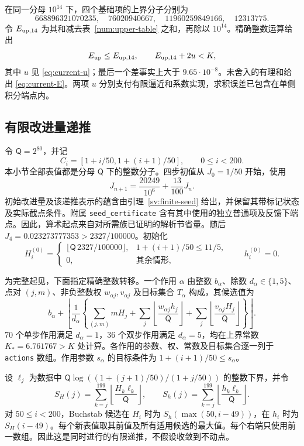 在同一分母 $10^{14}$ 下，四个基础项的上界分子分别为
\[
 668896321070235,\quad76020940667,\quad
 11960259849166,\quad12313775.
\]
令 $E_{\rm up,14}$ 为其和减去表~\ref{num:upper-table} 之和，再除以 $10^{14}$。精确整数运算给出
\[
 E_{\rm up}\le E_{\rm up,14},\qquad E_{\rm up,14}+2u<K,
\]
其中 $u$ 见 \eqref{eq:current-u}；最后一个差事实上大于 $9.65\cdot10^{-8}$。未舍入的有理和给出 \eqref{eq:current-E}。两项 $u$ 分别支付有限逼近和系数实现，求积误差已包含在单侧积分端点内。

\subsection{有限改进量递推}
令 $\mathsf Q=2^{80}$，并记
\[
 C_i=[1+i/50,1+(i+1)/50],\qquad 0\le i<200.
\]
本小节全部表值都是分母 $\mathsf Q$ 下的整数分子。四步初值从 $J_0=1/50$ 开始，使用
\[
 J_{n+1}=\frac{20249}{10^6}+\frac{13}{100}J_n.
\]
初始改进量及该递推表示的蕴含由引理~\ref{sv:finite-seed} 给出，并保留其带标记状态及实际截点条件。附属 \texttt{seed\_certificate} 含有其中使用的独立普通项及反馈下端点。因此，算术起点来自对所需族已证明的解析节省量。随后 $J_4=0.023273777353>2327/100000$。初始化
\begin{equation}
 H_i^{(0)}=
 \begin{cases}
 \lfloor \mathsf Q\,2327/100000\rfloor,&1+(i+1)/50\le11/5,\\
 0,&\text{其余情形},
 \end{cases}
 \qquad h_i^{(0)}=0.
 \label{num:table-seed}
\end{equation}

为完整起见，下面指定精确整数转移。一个作用 $\alpha$ 由整数 $b_\alpha$、除数 $d_\alpha\in\{1,5\}$、点对 $(j,m)$、非负整数权 $w_{\alpha j},v_{\alpha j}$ 及目标集合 $T_\alpha$ 构成，其候选值为
\begin{equation}
 b_\alpha+\left\lfloor\frac1{d_\alpha}
 \left\{\sum_{(j,m)}mH_j+
 \sum_j\left\lfloor\frac{w_{\alpha j}h_j}{\mathsf Q}\right\rfloor+
 \sum_j\left\lfloor\frac{v_{\alpha j}H_j}{\mathsf Q}\right\rfloor
 \right\}\right\rfloor.
 \label{num:action-map}
\end{equation}
$70$ 个单步作用满足 $d_\alpha=1$，$36$ 个双步作用满足 $d_\alpha=5$，均在上界常数 $K_*=6.761767>K$ 处计算。各作用的参数、权、常数及目标集合逐一列于 \texttt{actions} 数组。作用参数 $s_\alpha$ 的目标条件为 $1+(i+1)/50\le s_\alpha$。

设 $\ell_j$ 为数据中 $\mathsf Q\log((1+(j+1)/50)/(1+j/50))$ 的整数下界，并令
\[
 S_H(j)=\sum_{k=j}^{199}\left\lfloor\frac{H_k\ell_k}{\mathsf Q}\right\rfloor,
 \qquad
 S_h(j)=\sum_{k=j}^{199}\left\lfloor\frac{h_k\ell_k}{\mathsf Q}\right\rfloor.
\]
对 $50\le i<200$，Buchstab 候选在 $H_i$ 时为 $S_h(\max(50,i-49))$，在 $h_i$ 时为 $S_H(i-49)$。每个新表值取其前值及所有适用候选的最大值。每个右端只使用前一数组。因此这是同时进行的有限递推，不假设收敛到不动点。

